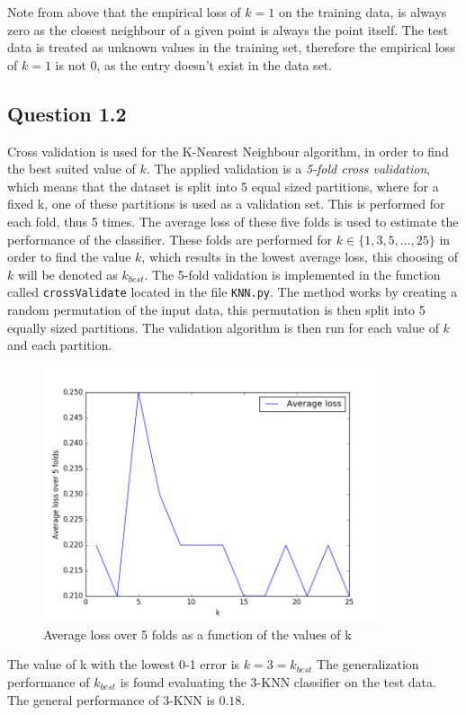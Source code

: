 \documentclass{article}
\begin{document}
Note from above that the empirical loss of $k=1$ on the training data, is always zero as the closest neighbour of a given point is always the point itself. The test data is treated as unknown values in the training set, therefore the empirical loss of $k=1$ is not 0, as the entry doesn't exist in the data set.
\subsection{Question 1.2}
Cross validation is used for the K-Nearest Neighbour algorithm, in order to find the best suited value of $k$. The applied validation is a \textit{5-fold cross validation}, which means that the dataset is split into 5 equal sized partitions, where for a fixed k, one of these partitions is used as a validation set. This is performed for each fold, thus 5 times. The average loss of these five folds is used to estimate the performance of the classifier. These folds are performed for $k \in \lbrace 1,3,5,...,25 \rbrace$ in order to find the value $k$, which results in the lowest average loss, this choosing of $k$ will be denoted as $k_{best}$.  
The 5-fold validation is implemented in the function called \texttt{crossValidate} located in the file \texttt{KNN.py}. The method works by creating a random permutation of the input data, this permutation is then split into 5 equally sized partitions. The validation algorithm is then run for each value of $k$ and each partition.
\begin{figure}[H]
  \centering
  \includegraphics[width=10cm]{ass1.png}
  \caption{Average loss over 5 folds as a function of the values of k}
  \label{fig:cross1}
\end{figure}
The value of k with the lowest 0-1 error is $k = 3 = k_{best}$
The generalization performance of $k_{best}$ is found evaluating the 3-KNN classifier on the test data. The general performance of 3-KNN is $0.18$.
\end{document}
